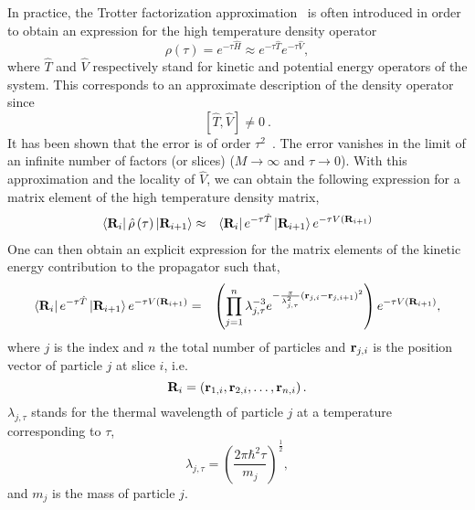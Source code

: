 \documentclass[12pt]{iopart}
\begin{document}
In practice, the Trotter factorization approximation~\cite{trotter_factor,simon_trotter,trotter_suzuki} is often introduced in order to obtain an expression for the high temperature density operator
\begin{equation}
\rho\left(\tau\right)=e^{ -\tau\hat{H} }\approx e^{-\tau\hat{T} }e^{ -\tau\hat{V} }, \label{eqn:trotter_prim}
\end{equation}
where $\hat{T}$ and $\hat{V}$ respectively stand for kinetic and potential energy operators of the system.
This corresponds to an approximate description of the density operator since 
\begin{equation}
\left[ \hat{T},\hat{V} \right]\ne0~.
\end{equation}
It has been shown that the error is of order  $\tau^2$~\cite{schulman_pi}. 
The error vanishes in the limit of an infinite number of factors (or slices) ($M\rightarrow \infty$ and $\tau \rightarrow 0$). 
With this approximation and the locality of $\hat{V}$, we can obtain the following expression for a matrix element of the high temperature density matrix,
\begin{eqnarray}
\left< {\bf R}_{i} \right|\hat{\rho}\left(\tau\right)\left| {\bf R}_{i+1} \right>&\approx&\left< {\bf R}_{i} \right| e^{-\tau\hat{T}} \left| {\bf R}_{i+1} \right> e^{ -\tau V\left( {\bf R}_{i+1}  \right)} \label{eqn:linka}
\end{eqnarray}
One can then obtain an explicit expression for the matrix elements of the kinetic energy contribution to the propagator such that,
\begin{eqnarray}
\left< {\bf R}_{i} \right| e^{-\tau\hat{T}} \left| {\bf R}_{i+1} \right> e^{ -\tau V\left( {\bf R}_{i+1}  \right)} 
&=&\left(\prod_{j=1}^n \lambda_{j,\tau}^{-3} e^{ -\frac{\pi}{\lambda_{j,\tau}^2} \left( {\bf r}_{j,i} -{\bf r}_{j,i+1} \right)^2 }\right) e^{ -\tau V\left( {\bf R}_{i+1} \right) }, \label{eqn:linkb}
\end{eqnarray}
where $j$ is the index and $n$ the total number of particles and ${\bf r}_{j,i}$ is the position vector of particle $j$ at slice $i$, i.e.
\begin{equation}
{\bf R}_i=\left({\bf r}_{1,i},{\bf r}_{2,i},\ldots, {\bf r}_{n,i}\right).
\end{equation}
$\lambda_{j,\tau}$ stands for the thermal wavelength of particle $j$ at a temperature corresponding to $\tau$,
\begin{equation}
\lambda_{j,\tau}=\left( \frac{2\pi \hbar^2 \tau}{m_j} \right)^{\frac{1}{2}}, \label{eqn:thermal_wl}
\end{equation}
and $m_j$ is the mass of particle $j$. 
\end{document}
